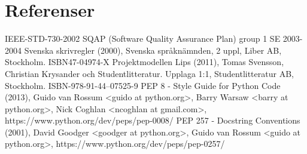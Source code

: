 \section{Referenser}

IEEE-STD-730-2002 SQAP (Software Quality Assurance Plan) group 1 SE 2003-2004
\newline
\newline
Svenska skrivregler (2000), Svenska språknämnden, 2 uppl, Liber AB, Stockholm. ISBN47-04974-X
\newline
\newline
Projektmodellen Lips (2011), Tomas Svensson, Christian Krysander och Studentlitteratur. Upplaga 1:1, Studentlitteratur AB, Stockholm. ISBN-978-91-44--07525-9
\newline
\newline
PEP 8 - Style Guide for Python Code (2013), Guido van Rossum \textless guido at python.org\textgreater,
\newline
Barry Warsaw \textless barry at python.org\textgreater, Nick Coghlan \textless ncoghlan at gmail.com\textgreater,
\newline
https://www.python.org/dev/peps/pep-0008/
\newline
\newline
PEP 257 - Docstring Conventions (2001), David Goodger \textless goodger at python.org\textgreater, Guido van Rossum \textless guido at python.org\textgreater,
https://www.python.org/dev/peps/pep-0257/


